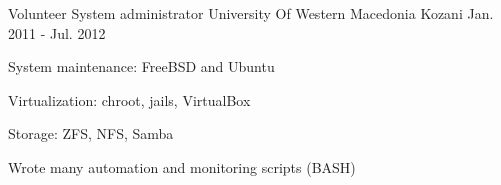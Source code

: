 


\begin{cventries}


\cventry
{Volunteer System administrator} %
{University Of Western Macedonia} %
{Kozani} %
{Jan. 2011 - Jul. 2012} %
{ %
\begin{cvitems}
\item {System maintenance: FreeBSD and Ubuntu}
\item {Virtualization: chroot, jails, VirtualBox}
\item {Storage: ZFS, NFS, Samba}
\item {Wrote many automation and monitoring scripts (BASH)}
\end{cvitems}
}


\end{cventries}

